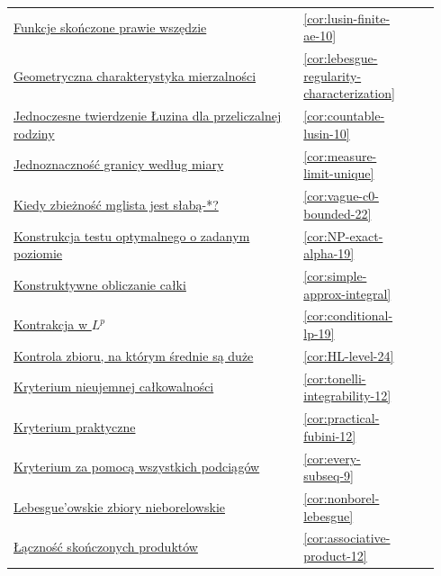 \documentclass[11pt,a4paper,oneside]{book}
\numberwithin{equation}{chapter}
\theoremstyle{plain}
\theoremstyle{definition}
\theoremstyle{remark}
\begin{document}
\begin{longtable}{@{}p{0.72\linewidth}p{0.135\linewidth}p{0.08\linewidth}@{}}
\hyperref[cor:lusin-finite-ae-10]{Funkcje skończone prawie wszędzie} & \ref*{cor:lusin-finite-ae-10} & \pageref*{cor:lusin-finite-ae-10} \\
\hyperref[cor:lebesgue-regularity-characterization]{Geometryczna charakterystyka mierzalności} & \ref*{cor:lebesgue-regularity-characterization} & \pageref*{cor:lebesgue-regularity-characterization} \\
\hyperref[cor:countable-lusin-10]{Jednoczesne twierdzenie Łuzina dla przeliczalnej rodziny} & \ref*{cor:countable-lusin-10} & \pageref*{cor:countable-lusin-10} \\
\hyperref[cor:measure-limit-unique]{Jednoznaczność granicy według miary} & \ref*{cor:measure-limit-unique} & \pageref*{cor:measure-limit-unique} \\
\hyperref[cor:vague-c0-bounded-22]{Kiedy zbieżność mglista jest słabą-*?} & \ref*{cor:vague-c0-bounded-22} & \pageref*{cor:vague-c0-bounded-22} \\
\hyperref[cor:NP-exact-alpha-19]{Konstrukcja testu optymalnego o zadanym poziomie} & \ref*{cor:NP-exact-alpha-19} & \pageref*{cor:NP-exact-alpha-19} \\
\hyperref[cor:simple-approx-integral]{Konstruktywne obliczanie całki} & \ref*{cor:simple-approx-integral} & \pageref*{cor:simple-approx-integral} \\
\hyperref[cor:conditional-lp-19]{Kontrakcja w $L^p$} & \ref*{cor:conditional-lp-19} & \pageref*{cor:conditional-lp-19} \\
\hyperref[cor:HL-level-24]{Kontrola zbioru, na którym średnie są duże} & \ref*{cor:HL-level-24} & \pageref*{cor:HL-level-24} \\
\hyperref[cor:tonelli-integrability-12]{Kryterium nieujemnej całkowalności} & \ref*{cor:tonelli-integrability-12} & \pageref*{cor:tonelli-integrability-12} \\
\hyperref[cor:practical-fubini-12]{Kryterium praktyczne} & \ref*{cor:practical-fubini-12} & \pageref*{cor:practical-fubini-12} \\
\hyperref[cor:every-subseq-9]{Kryterium za pomocą wszystkich podciągów} & \ref*{cor:every-subseq-9} & \pageref*{cor:every-subseq-9} \\
\hyperref[cor:nonborel-lebesgue]{Lebesgue'owskie zbiory nieborelowskie} & \ref*{cor:nonborel-lebesgue} & \pageref*{cor:nonborel-lebesgue} \\
\hyperref[cor:associative-product-12]{Łączność skończonych produktów} & \ref*{cor:associative-product-12} & \pageref*{cor:associative-product-12} \\

\end{longtable}
\end{document}
